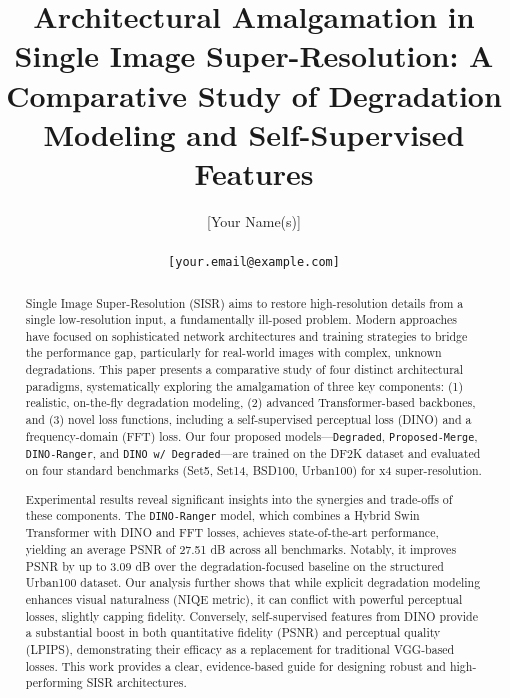 \documentclass[10pt,twocolumn,letterpaper]{article}
\title{\textbf{Architectural Amalgamation in Single Image Super-Resolution: A Comparative Study of Degradation Modeling and Self-Supervised Features}}
\author{
    [Your Name(s)]\\
    [Your Affiliation(s)]\\
    {\tt\small [your.email@example.com]}
}
\date{} %
\begin{document}
\maketitle

\begin{abstract}
\noindent Single Image Super-Resolution (SISR) aims to restore high-resolution details from a single low-resolution input, a fundamentally ill-posed problem. Modern approaches have focused on sophisticated network architectures and training strategies to bridge the performance gap, particularly for real-world images with complex, unknown degradations. This paper presents a comparative study of four distinct architectural paradigms, systematically exploring the amalgamation of three key components: (1) realistic, on-the-fly degradation modeling, (2) advanced Transformer-based backbones, and (3) novel loss functions, including a self-supervised perceptual loss (DINO) and a frequency-domain (FFT) loss. Our four proposed models—\texttt{Degraded}, \texttt{Proposed-Merge}, \texttt{DINO-Ranger}, and \texttt{DINO w/ Degraded}—are trained on the DF2K dataset and evaluated on four standard benchmarks (Set5, Set14, BSD100, Urban100) for x4 super-resolution. 

Experimental results reveal significant insights into the synergies and trade-offs of these components. The \texttt{DINO-Ranger} model, which combines a Hybrid Swin Transformer with DINO and FFT losses, achieves state-of-the-art performance, yielding an average PSNR of 27.51 dB across all benchmarks. Notably, it improves PSNR by up to 3.09 dB over the degradation-focused baseline on the structured Urban100 dataset. Our analysis further shows that while explicit degradation modeling enhances visual naturalness (NIQE metric), it can conflict with powerful perceptual losses, slightly capping fidelity. Conversely, self-supervised features from DINO provide a substantial boost in both quantitative fidelity (PSNR) and perceptual quality (LPIPS), demonstrating their efficacy as a replacement for traditional VGG-based losses. This work provides a clear, evidence-based guide for designing robust and high-performing SISR architectures.
\end{abstract}

\end{document}
